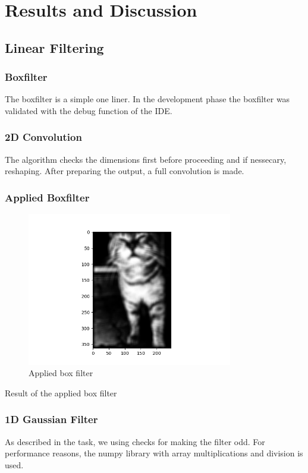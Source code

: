 \documentclass[12pt]{article}
\begin{document}
\section{Results and Discussion}

\subsection{Linear Filtering}

\subsubsection{Boxfilter}
The boxfilter is a simple one liner. In the development phase the boxfilter was validated with the
debug function of the IDE.
\subsubsection{2D Convolution}
The algorithm checks the dimensions first before proceeding and if nessecary, reshaping. After preparing the output,
a full convolution is made.

\subsubsection{Applied Boxfilter}
\begin{figure}[!htb]
  \centering
  \includegraphics[width=0.8\textwidth]{pics/1_3_s}
  \caption{Applied box filter}
\end{figure}
Result of the applied box filter

\subsubsection{1D Gaussian Filter}
As described in the task, we using checks for making the filter odd. For performance reasons,
the numpy library with array multiplications and division is used.
\end{document}
